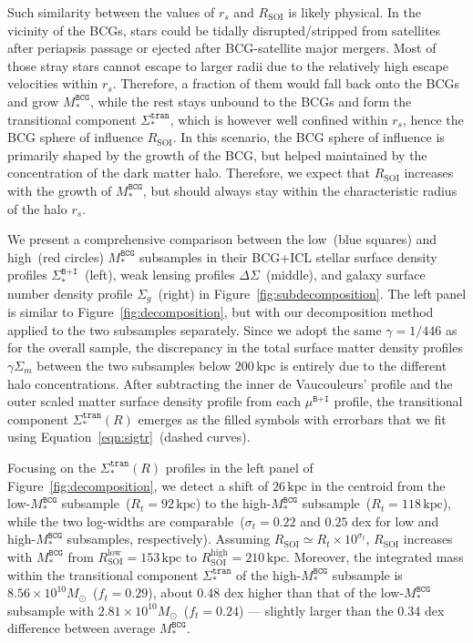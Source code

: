 \documentclass[fleqn,usenatbib]{mnras}
\newcommand{\rsoi}{R_{\mathrm{SOI}}}
\newcommand{\sigbi}{\Sigma_*^{\texttt{B+I}}}
\newcommand{\sigm}{\Sigma_m}
\newcommand{\sigg}{\Sigma_g}
\newcommand{\sigtr}{\Sigma_*^{\texttt{tran}}}
\newcommand{\mubi}{\mu^{\texttt{B+I}}}
\newcommand{\msbcg}{M_*^{\texttt{BCG}}}
\newcommand{\kpc}{\mathrm{kpc}}
\newcommand{\msol}{M_{\odot}}
\newcommand{\ds}{\Delta\Sigma}
\begin{document}
Such similarity between the values of $r_s$ and $\rsoi$ is likely physical.
In the vicinity of the BCGs, stars could be tidally disrupted/stripped from
satellites after periapsis passage or ejected after BCG-satellite major
mergers. Most of those stray stars cannot escape to larger radii due to the
relatively high escape velocities within $r_s$. Therefore, a fraction of
them would fall back onto the BCGs and grow $\msbcg$, while the rest stays
unbound to the BCGs and form the transitional component $\sigtr$, which is
however well confined within $r_s$, hence the BCG sphere of influence
$\rsoi$.  In this scenario, the BCG sphere of influence is primarily shaped
by the growth of the BCG, but helped maintained by the concentration of the
dark matter halo. Therefore, we expect that $\rsoi$ increases with the
growth of $\msbcg$, but should always stay within the characteristic radius
of the halo $r_s$.


We present a comprehensive comparison between the low~(blue squares) and
high~(red circles) $\msbcg$ subsamples in their BCG+ICL stellar surface
density profiles $\sigbi$~(left), weak lensing profiles $\ds$~(middle), and
galaxy surface number density profile $\sigg$~(right) in
Figure~\ref{fig:subdecomposition}. The left panel is similar to
Figure~\ref{fig:decomposition}, but with our decomposition method applied
to the two subsamples separately. Since we adopt the same $\gamma{=}1/446$
as for the overall sample, the discrepancy in the total surface matter
density profiles $\gamma\sigm$ between the two subsamples below $200\,\kpc$
is entirely due to the different halo concentrations.  After subtracting
the inner de Vaucouleurs' profile and the outer scaled matter surface
density profile from each $\mubi$ profile, the transitional component
$\sigtr(R)$ emerges as the filled symbols with errorbars that we fit using
Equation~\ref{eqn:sigtr}~(dashed curves).


Focusing on the $\sigtr(R)$ profiles in the left panel of
Figure~\ref{fig:decomposition}, we detect a shift of $26\,\kpc$ in the
centroid from the low-$\msbcg$ subsample~($R_{t}{=}92\,\kpc$) to the
high-$\msbcg$ subsample~($R_{t}{=}118\,\kpc$), while the two log-widths are
comparable~($\sigma_t{=}0.22$ and $0.25$ dex for low and high-$\msbcg$
subsamples, respectively). Assuming
$\rsoi{\simeq}R_{t}{\times}10^{\sigma_t}$, $\rsoi$ increases with $\msbcg$
from $R_{\mathrm{SOI}}^{\mathrm{low}}{=}153\,\kpc$ to
$R_{\mathrm{SOI}}^{\mathrm{high}}{=}210\,\kpc$. Moreover, the integrated
mass within the transitional component $\sigtr$ of the high-$\msbcg$
subsample is $8.56{\times}10^{10}\msol$~($f_t{=}0.29$), about 0.48 dex higher
than that of the low-$\msbcg$ subsample with
$2.81{\times}10^{10}\msol$~($f_t{=}0.24$) --- slightly larger than the 0.34
dex difference between average $\msbcg$.
\end{document}
